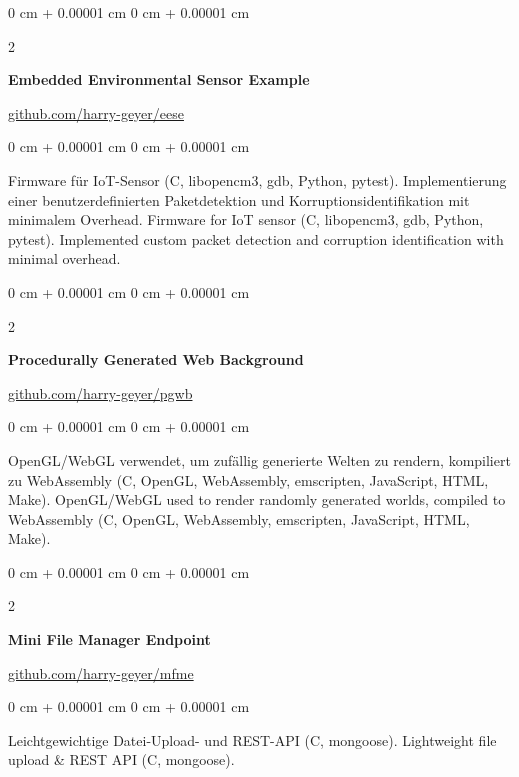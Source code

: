 \documentclass[10pt, letterpaper]{article}
\newenvironment{onecolentry}{
    \begin{adjustwidth}{
        0 cm + 0.00001 cm
    }{
        0 cm + 0.00001 cm
    }
}{
    \end{adjustwidth}
}
\newenvironment{twocolentry}[2][]{
    \onecolentry
    \def\secondColumn{#2}
    \setcolumnwidth{\fill, 4.75 cm}
    \begin{paracol}{2}
}{
    \switchcolumn \raggedleft \secondColumn
    \end{paracol}
    \endonecolentry
}
\begin{document}
        \begin{twocolentry}{\href{https://github.com/harry-geyer/eese}{github.com/harry-geyer/eese}}
            \textbf{Embedded Environmental Sensor Example}
        \end{twocolentry}

        \vspace{0.10 cm}
        \begin{onecolentry}
            \ifdefined\german
            Firmware für IoT-Sensor (C, libopencm3, gdb, Python, pytest). Implementierung einer benutzerdefinierten Paketdetektion und Korruptionsidentifikation mit minimalem Overhead.
            \else
            Firmware for IoT sensor (C, libopencm3, gdb, Python, pytest). Implemented custom packet detection and corruption identification with minimal overhead.
            \fi
        \end{onecolentry}

        \vspace{0.2 cm}

        \begin{twocolentry}{\href{https://github.com/harry-geyer/pgwb}{github.com/harry-geyer/pgwb}}
            \textbf{Procedurally Generated Web Background}
        \end{twocolentry}

        \vspace{0.10 cm}
        \begin{onecolentry}
            \ifdefined\german
            OpenGL/WebGL verwendet, um zufällig generierte Welten zu rendern, kompiliert zu WebAssembly (C, OpenGL, WebAssembly, emscripten, JavaScript, HTML, Make).
            \else
            OpenGL/WebGL used to render randomly generated worlds, compiled to WebAssembly (C, OpenGL, WebAssembly, emscripten, JavaScript, HTML, Make).
            \fi
        \end{onecolentry}

        \vspace{0.2 cm}

        \begin{twocolentry}{\href{https://github.com/harry-geyer/mfme}{github.com/harry-geyer/mfme}}
            \textbf{Mini File Manager Endpoint}
        \end{twocolentry}
        
        \vspace{0.10 cm}
        \begin{onecolentry}
            \ifdefined\german
            Leichtgewichtige Datei-Upload- und REST-API (C, mongoose).
            \else
            Lightweight file upload \& REST API (C, mongoose).
            \fi
        \end{onecolentry}
        
\end{document}
